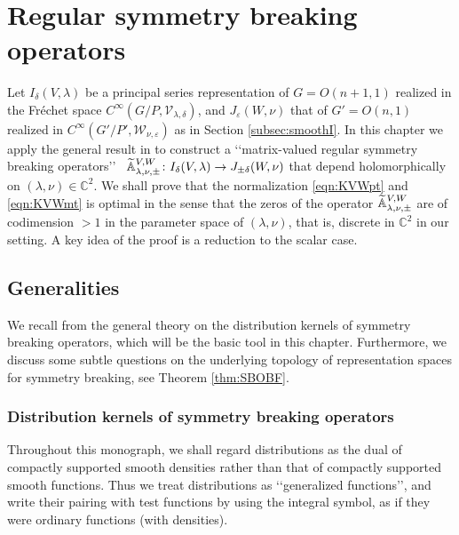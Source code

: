{}~~~~~{}
\newpage
\section{Regular symmetry breaking operators}
\label{sec:section7}

Let 
$
I_{\delta}(V,\lambda)
$
 be a principal series representation
 of $G=O(n+1,1)$
 realized in the Fr{\'e}chet space 
 $C^{\infty}(G/P, {\mathcal{V}}_{\lambda,\delta})$, 
 and 
$
J_{\varepsilon}(W,\nu)
$
 that of $G'=O(n,1)$
 realized in $C^{\infty}(G'/P', {\mathcal{W}}_{\nu,\varepsilon})$
 as in Section \ref{subsec:smoothI}.  
In this chapter 
 we apply the general result in \cite[Chap.~3]{sbon} to construct a 
 \lq\lq{matrix-valued regular symmetry breaking operators}\rq\rq\
$
   {\widetilde{\mathbb{A}}}_{{\lambda},{\nu},{\pm}}^{{V,W}}
   \colon
   I_{\delta}(V,\lambda) \to J_{\pm \delta}(W,\nu)
$
 that depend holomorphically on $(\lambda, \nu) \in {\mathbb{C}}^2$. 
We shall prove
 that the normalization \eqref{eqn:KVWpt} and \eqref{eqn:KVWmt}
 is optimal
 in the sense
 that the zeros of the operator
 ${\widetilde{\mathbb{A}}}_{{\lambda},{\nu},{\pm}}^{{V,W}}$
 are of codimension $>1$ in the parameter space of $(\lambda, \nu)$, 
 that is, 
 discrete in ${\mathbb{C}}^2$ in our setting.  
A key idea of the proof is a reduction to the scalar case.   

\subsection{Generalities}
We recall from the general theory \cite[Chap.~3]{sbon}
 on the distribution kernels 
 of symmetry breaking operators, 
 which will be the basic tool in this chapter.  
Furthermore,
 we discuss some subtle questions
 on the underlying topology 
 of representation spaces for symmetry breaking, 
 see Theorem \ref{thm:SBOBF}.  

\subsubsection{Distribution kernels of symmetry breaking operators}

Throughout this monograph,
 we shall regard distributions
 as the dual of compactly supported smooth densities
 rather than that of compactly supported smooth functions.
Thus we treat distributions as \lq\lq{generalized functions}\rq\rq, 
 and write their pairing 
 with test functions by using the integral symbol,  
 as if they were ordinary functions
 (with densities).  



